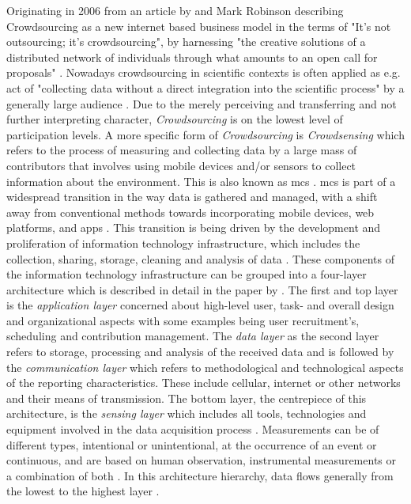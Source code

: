 {Originating in 2006 from an article by \autocite{howeRiseCrowdsourcing} and Mark Robinson describing Crowdsourcing as a new internet based business model in the terms of "It's not outsourcing; it's crowdsourcing", by harnessing "the creative solutions of a distributed network of individuals through what amounts to an open call for proposals" \autocite[76]{brabhamCrowdsourcingModelProblem2008}. Nowadays crowdsourcing in scientific contexts is often applied as e.g. act of "collecting data without a direct integration into the scientific process" by a generally large audience \autocite[1591]{weeserCitizenSciencePioneers2018a}. Due to the merely perceiving and transferring and not further interpreting character, \textit{Crowdsourcing} is on the lowest level of participation levels. A more specific form of \textit{Crowdsourcing} is \textit{Crowdsensing} which refers to the process of measuring and collecting data by a large mass of contributors that involves using mobile devices and/or sensors to collect information about the environment. This is also known as \acrfull{mcs} \autocite{guoParticipatorySensingMobile2014, liuSurveyMobileCrowdsensing2018}.
\acrshort*{mcs} is part of a widespread transition in the way data is gathered and managed, with a shift away from conventional methods towards incorporating mobile devices, web platforms, and apps \autocite{capponiSurveyMobileCrowdsensing2019, sanllorentecapdevilaSuccessFactorsCitizen2020}. This transition is being driven by the development and proliferation of information technology infrastructure, which includes the collection, sharing, storage, cleaning and analysis of data \autocite{fraislCitizenScienceEnvironmental2022}. These components of the information technology infrastructure can be grouped into a four-layer architecture which is described in detail in the paper by \autocite{capponiSurveyMobileCrowdsensing2019}.
The first and top layer is the \textit{application layer} concerned about high-level user, task- and overall design and organizational aspects with some examples being user recruitment's, scheduling and contribution management. The \textit{data layer} as the second layer refers to storage, processing and analysis of the received data and is followed by the \textit{communication layer} which refers to methodological and technological aspects of the reporting characteristics. These include cellular, internet or other networks and their means of transmission. The bottom layer, the centrepiece of this architecture, is the \textit{sensing layer} which includes all tools, technologies and equipment involved in the data acquisition process \autocite{capponiSurveyMobileCrowdsensing2019}. Measurements can be of different types, intentional or unintentional, at the occurrence of an event or continuous, and are based on human observation, instrumental measurements or a combination of both \autocite{zhengCrowdsourcingMethodsData2018}. In this architecture hierarchy, data flows generally from the lowest to the highest layer \autocite{aceves-buenoCitizenScienceApproach2015,capponiSurveyMobileCrowdsensing2019,zhengCrowdsourcingMethodsData2018}.
}

